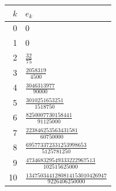 \begin{tabular}{r@{\qquad}l}
\toprule
$k$ & $e_k$ \\
\midrule
0 & $0$ \\[1.2ex]
1 & $0$ \\[1.2ex]
2 & $\frac{32}{75}$ \\[1.2ex]
3 & $\frac{2058319}{4500}$ \\[1.2ex]
4 & $\frac{3046313977}{90000}$ \\[1.2ex]
5 & $\frac{3010251653251}{1518750}$ \\[1.2ex]
6 & $\frac{8250007730158441}{91125000}$ \\[1.2ex]
7 & $\frac{223846253563431581}{60750000}$ \\[1.2ex]
8 & $\frac{695773372331253998653}{5125781250}$ \\[1.2ex]
9 & $\frac{473468329549333222967513}{102515625000}$ \\[1.2ex]
10 & $\frac{1347503441280814153010426947}{9226406250000}$ \\[1.2ex]
\bottomrule
\end{tabular}
